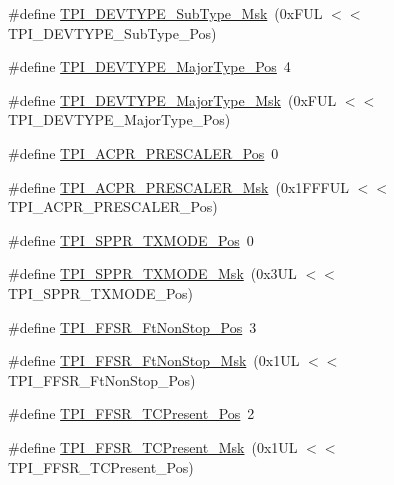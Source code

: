 \begin{DoxyCompactItemize}
\#define \hyperlink{group___c_m_s_i_s___t_p_i_ga5b2fd7dddaf5f64855d9c0696acd65c1}{T\+P\+I\+\_\+\+D\+E\+V\+T\+Y\+P\+E\+\_\+\+Sub\+Type\+\_\+\+Msk}~(0x\+F\+U\+L $<$$<$ T\+P\+I\+\_\+\+D\+E\+V\+T\+Y\+P\+E\+\_\+\+Sub\+Type\+\_\+\+Pos)
\item 
\#define \hyperlink{group___c_m_s_i_s___t_p_i_ga69c4892d332755a9f64c1680497cebdd}{T\+P\+I\+\_\+\+D\+E\+V\+T\+Y\+P\+E\+\_\+\+Major\+Type\+\_\+\+Pos}~4
\item 
\#define \hyperlink{group___c_m_s_i_s___t_p_i_gaecbceed6d08ec586403b37ad47b38c88}{T\+P\+I\+\_\+\+D\+E\+V\+T\+Y\+P\+E\+\_\+\+Major\+Type\+\_\+\+Msk}~(0x\+F\+U\+L $<$$<$ T\+P\+I\+\_\+\+D\+E\+V\+T\+Y\+P\+E\+\_\+\+Major\+Type\+\_\+\+Pos)
\item 
\#define \hyperlink{group___c_m_s_i_s___t_p_i_ga5a82d274eb2df8b0c92dd4ed63535928}{T\+P\+I\+\_\+\+A\+C\+P\+R\+\_\+\+P\+R\+E\+S\+C\+A\+L\+E\+R\+\_\+\+Pos}~0
\item 
\#define \hyperlink{group___c_m_s_i_s___t_p_i_ga4fcacd27208419929921aec8457a8c13}{T\+P\+I\+\_\+\+A\+C\+P\+R\+\_\+\+P\+R\+E\+S\+C\+A\+L\+E\+R\+\_\+\+Msk}~(0x1\+F\+F\+F\+U\+L $<$$<$ T\+P\+I\+\_\+\+A\+C\+P\+R\+\_\+\+P\+R\+E\+S\+C\+A\+L\+E\+R\+\_\+\+Pos)
\item 
\#define \hyperlink{group___c_m_s_i_s___t_p_i_ga0f302797b94bb2da24052082ab630858}{T\+P\+I\+\_\+\+S\+P\+P\+R\+\_\+\+T\+X\+M\+O\+D\+E\+\_\+\+Pos}~0
\item 
\#define \hyperlink{group___c_m_s_i_s___t_p_i_gaca085c8a954393d70dbd7240bb02cc1f}{T\+P\+I\+\_\+\+S\+P\+P\+R\+\_\+\+T\+X\+M\+O\+D\+E\+\_\+\+Msk}~(0x3\+U\+L $<$$<$ T\+P\+I\+\_\+\+S\+P\+P\+R\+\_\+\+T\+X\+M\+O\+D\+E\+\_\+\+Pos)
\item 
\#define \hyperlink{group___c_m_s_i_s___t_p_i_ga9537b8a660cc8803f57cbbee320b2fc8}{T\+P\+I\+\_\+\+F\+F\+S\+R\+\_\+\+Ft\+Non\+Stop\+\_\+\+Pos}~3
\item 
\#define \hyperlink{group___c_m_s_i_s___t_p_i_gaaa313f980974a8cfc7dac68c4d805ab1}{T\+P\+I\+\_\+\+F\+F\+S\+R\+\_\+\+Ft\+Non\+Stop\+\_\+\+Msk}~(0x1\+U\+L $<$$<$ T\+P\+I\+\_\+\+F\+F\+S\+R\+\_\+\+Ft\+Non\+Stop\+\_\+\+Pos)
\item 
\#define \hyperlink{group___c_m_s_i_s___t_p_i_gad30fde0c058da2ffb2b0a213be7a1b5c}{T\+P\+I\+\_\+\+F\+F\+S\+R\+\_\+\+T\+C\+Present\+\_\+\+Pos}~2
\item 
\#define \hyperlink{group___c_m_s_i_s___t_p_i_ga0d6bfd263ff2fdec72d6ec9415fb1135}{T\+P\+I\+\_\+\+F\+F\+S\+R\+\_\+\+T\+C\+Present\+\_\+\+Msk}~(0x1\+U\+L $<$$<$ T\+P\+I\+\_\+\+F\+F\+S\+R\+\_\+\+T\+C\+Present\+\_\+\+Pos)
\item 

\end{DoxyCompactItemize}
